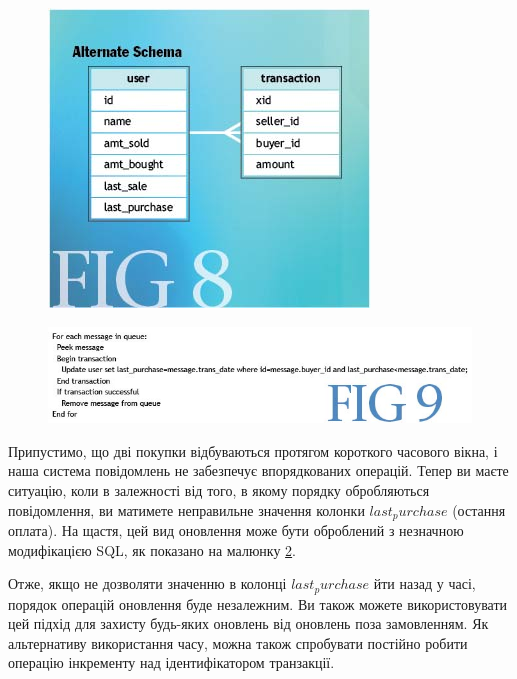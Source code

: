 \documentclass[14pt]{vakthesis}
\begin{document}
\begin{figure}
\centering
\includegraphics[width=\linewidth]{images/fig8.jpg}
     \label{fig:fig_8}
\end{figure}

\begin{figure}
\centering
\includegraphics[width=\linewidth]{images/fig9.jpg}
     \label{fig:fig_9}
\end{figure}

Припустимо, що дві покупки відбуваються протягом короткого часового вікна, і наша система повідомлень не забезпечує впорядкованих операцій. Тепер ви маєте ситуацію, коли в залежності від того, в якому порядку обробляються повідомлення, ви матимете неправильне значення колонки $last_purchase$ (остання оплата). 
На щастя, цей вид оновлення може бути оброблений з незначною модифікацією SQL, як показано на малюнку \ref{fig:fig_9}.

Отже, якщо не дозволяти значенню в колонці $last_purchase$ йти назад у часі, порядок операцій оновлення буде незалежним.
Ви також можете використовувати цей підхід для захисту будь-яких оновлень від оновлень поза замовленням. Як альтернативу використання часу, 
можна також спробувати постійно робити операцію інкременту над ідентифікатором транзакції.
\end{document}
